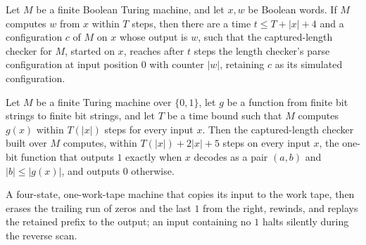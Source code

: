 \begin{lemma}
\label{Turing.FinTM.lenStart}
\leanok
{}
Let $M$ be a finite Boolean Turing machine, and let $x,w$ be Boolean words. If $M$
computes $w$ from $x$ within $T$ steps, then there are a time $t\le T+|x|+4$ and a
configuration $c$ of $M$ on $x$ whose output is $w$, such that the captured-length
checker for $M$, started on $x$, reaches after $t$ steps the length checker’s parse
configuration at input position $0$ with counter $|w|$, retaining $c$ as its simulated
configuration.
\end{lemma}

\begin{lemma}
\label{Turing.FinTM.pairCount_computes}
\leanok
{}
Let $M$ be a finite Turing machine over $\{0,1\}$, let $g$ be a function from finite
bit strings to finite bit strings, and let $T$ be a time bound such that $M$ computes
$g(x)$ within $T(|x|)$ steps for every input $x$. Then the captured-length checker built
over $M$ computes, within $T(|x|)+2|x|+5$ steps on every input $x$, the one-bit function
that outputs $1$ exactly when $x$ decodes as a pair $(a,b)$ and $|b|\le |g(x)|$, and
outputs $0$ otherwise.
\end{lemma}

\begin{definition}
\label{Turing.FinTM.rawStripTM}
\leanok
{}
A four-state, one-work-tape machine that copies its input to the work tape,
then erases the trailing run of zeros and the last $1$ from the right, rewinds,
and replays the retained prefix to the output; an input containing no $1$
halts silently during the reverse scan.
\end{definition}

